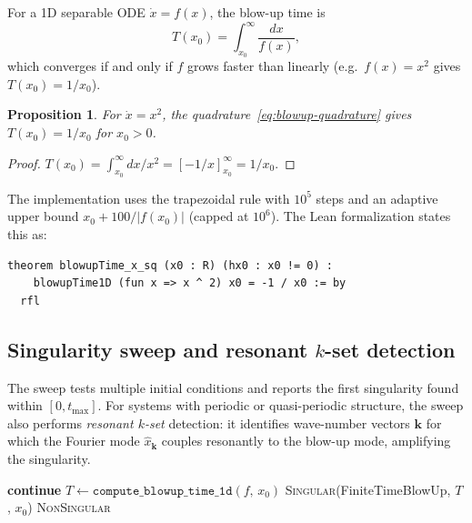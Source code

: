 \documentclass[11pt,a4paper]{article}
\newtheorem{proposition}[theorem]{Proposition}
\begin{document}
For a 1D separable ODE $\dot{x}=f(x)$, the blow-up time is
\begin{equation}\label{eq:blowup-quadrature}
  T(x_{0})=\int_{x_{0}}^{\infty}\frac{dx}{f(x)},
\end{equation}
which converges if and only if $f$ grows faster than linearly (e.g.\
$f(x)=x^{2}$ gives $T(x_{0})=1/x_{0}$).

\begin{proposition}
For $\dot{x}=x^{2}$, the quadrature~\eqref{eq:blowup-quadrature} gives
$T(x_{0})=1/x_{0}$ for $x_{0}>0$.
\end{proposition}

\begin{proof}
$T(x_{0})=\int_{x_{0}}^{\infty}dx/x^{2}=[-1/x]_{x_{0}}^{\infty}=1/x_{0}$.
\end{proof}

The implementation uses the trapezoidal rule with $10^{5}$ steps and an
adaptive upper bound $x_{0}+100/\lvert f(x_{0})\rvert$ (capped at
$10^{6}$).  The Lean formalization states this as:

\begin{lstlisting}[language={},caption={\texttt{Singularity.lean}}]
theorem blowupTime_x_sq (x0 : R) (hx0 : x0 != 0) :
    blowupTime1D (fun x => x ^ 2) x0 = -1 / x0 := by
  rfl
\end{lstlisting}

\subsection{Singularity sweep and resonant $k$-set detection}

The sweep tests multiple initial conditions and reports the first
singularity found within $[0,t_{\max}]$.  For systems with periodic or
quasi-periodic structure, the sweep also performs \emph{resonant
$k$-set} detection: it identifies wave-number vectors $\mathbf{k}$ for
which the Fourier mode $\hat{x}_{\mathbf{k}}$ couples resonantly to the
blow-up mode, amplifying the singularity.

\begin{algorithm}[H]
\caption{Singularity sweep (\texttt{sweep\_singularity\_1d})}
\begin{algorithmic}[1]
    \State \textbf{continue} 
  \EndIf
  \State $T\gets\texttt{compute\_blowup\_time\_1d}(f,\,x_{0})$
    \State \Return \textsc{Singular}(FiniteTimeBlowUp, $T$, $x_{0}$)
  \EndIf
\EndFor
\State \Return \textsc{NonSingular}
\end{algorithmic}
\end{algorithm}
\end{document}
